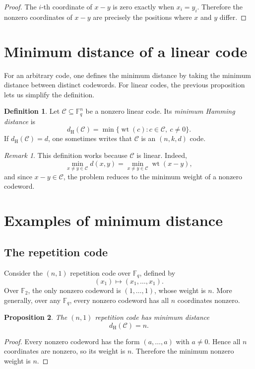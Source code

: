 \documentclass[11pt]{article}
\newtheorem{proposition}{Proposition}[section]
\theoremstyle{definition}
\newtheorem{definition}[proposition]{Definition}
\theoremstyle{remark}
\newtheorem*{remark}{Remark}
\newcommand{\F}{\mathbb{F}}
\newcommand{\code}{\mathcal{C}}
\newcommand{\wt}{\operatorname{wt}}
\newcommand{\dH}{d_{\mathrm H}}
\begin{document}
\begin{proof}
The $i$-th coordinate of $x-y$ is zero exactly when $x_i=y_i$. Therefore the nonzero coordinates of $x-y$ are precisely the positions where $x$ and $y$ differ.
\end{proof}

\section{Minimum distance of a linear code}

For an arbitrary code, one defines the minimum distance by taking the minimum distance between distinct codewords. For linear codes, the previous proposition lets us simplify the definition.

\begin{definition}
Let $\code\subseteq\F_q^n$ be a nonzero linear code. Its \emph{minimum Hamming distance} is
\[
\dH(\code)=\min\{\wt(c): c\in\code,\ c\neq 0\}.
\]
If $\dH(\code)=d$, one sometimes writes that $\code$ is an $(n,k,d)$ code.
\end{definition}

\begin{remark}
This definition works because $\code$ is linear. Indeed,
\[
\min_{x\neq y\in\code} d(x,y)=\min_{x\neq y\in\code}\wt(x-y),
\]
and since $x-y\in\code$, the problem reduces to the minimum weight of a nonzero codeword.
\end{remark}

\section{Examples of minimum distance}

\subsection{The repetition code}

Consider the $(n,1)$ repetition code over $\F_q$, defined by
\[
(x_1)\longmapsto (x_1,\dots,x_1).
\]
Over $\F_2$, the only nonzero codeword is $(1,\dots,1)$, whose weight is $n$. More generally, over any $\F_q$, every nonzero codeword has all $n$ coordinates nonzero.

\begin{proposition}
The $(n,1)$ repetition code has minimum distance
\[
\dH(\code)=n.
\]
\end{proposition}

\begin{proof}
Every nonzero codeword has the form $(a,\dots,a)$ with $a\neq 0$. Hence all $n$ coordinates are nonzero, so its weight is $n$. Therefore the minimum nonzero weight is $n$.
\end{proof}
\end{document}
